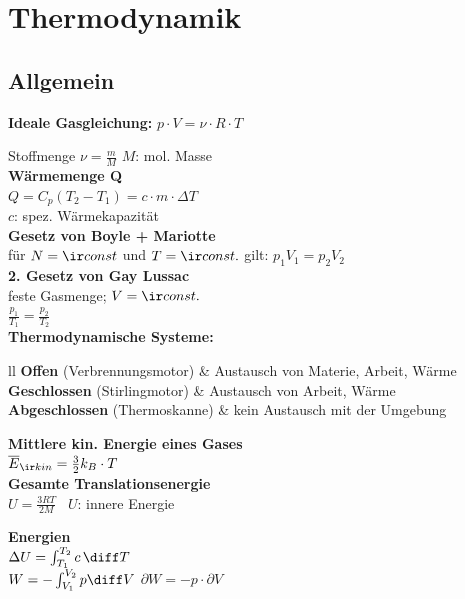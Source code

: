 \documentclass[german]{latex4ei/latex4ei_sheet}
\begin{document}
\section{Thermodynamik}
\begin{sectionbox}
\subsection{Allgemein}
\begin{emphbox}
\textbf{Ideale Gasgleichung:} $p \cdot V = \nu \cdot R \cdot T$
\end{emphbox}
Stoffmenge $\nu = \frac{m}{M}$ \qquad $M$: mol. Masse\\
\textbf{Wärmemenge Q} \\
$Q=C_p(T_2-T_1)=c \cdot m \cdot \Delta T$ \\ $c$: spez. Wärmekapazität \\

\textbf{Gesetz von Boyle + Mariotte} \\
für $N=\ir const$ und $T=\ir const.$ gilt: $p_1V_1=p_2V_2$ \\

\textbf{2. Gesetz von Gay Lussac} \\
feste Gasmenge; $V=\ir const.$\\
$\frac{p_1}{T_1}=\frac{p_2}{T_2}$ \\
\textbf{Thermodynamische Systeme:}
\begin{tablebox}{ll}
	\textbf{Offen} (Verbrennungsmotor) &
		Austausch von Materie, Arbeit, Wärme \\
	\textbf{Geschlossen} (Stirlingmotor) &
		Austausch von Arbeit, Wärme \\
	\textbf{Abgeschlossen} (Thermoskanne) &
		kein Austausch mit der Umgebung
		
\end{tablebox}
\textbf{Mittlere kin. Energie eines Gases} \\
$\overline{E}_{\ir kin}=\frac{3}{2}k_B \cdot T$ \\

\textbf{Gesamte Translationsenergie} \\
$U=\frac{3RT}{2M}$ \, $U$: innere Energie

\textbf{Energien}\\
$\Delta U = \int_{T_1}^{T_2} c \, \diff T$\\
$W=-\int_{V_1}^{V_2} p \diff V$ \qquad $\partial W= -p \cdot \partial V$
\end{sectionbox}
\end{document}
